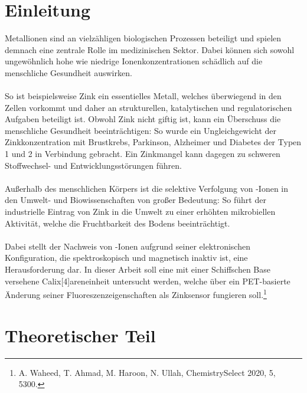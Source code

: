 \documentclass[12pt,a4paper]{report}
\begin{document}
	\chapter{Einleitung}
	\noindent Metallionen sind an vielzähligen biologischen Prozessen beteiligt und spielen demnach eine zentrale Rolle im medizinischen Sektor. Dabei können sich sowohl ungewöhnlich hohe wie niedrige Ionenkonzentrationen schädlich auf die menschliche Gesundheit auswirken.\\
	\ \\
	So ist beispielsweise Zink ein essentielles Metall, welches überwiegend in den Zellen vorkommt und daher an strukturellen, katalytischen und regulatorischen Aufgaben beteiligt ist. Obwohl Zink nicht giftig ist, kann ein Überschuss die menschliche Gesundheit beeinträchtigen: So wurde ein Ungleichgewicht der Zinkkonzentration mit Brustkrebs, Parkinson, Alzheimer und Diabetes der Typen 1 und 2 in Verbindung gebracht. Ein Zinkmangel kann dagegen zu schweren Stoffwechsel- und Entwicklungsstörungen führen.\\
	\ \\
	Außerhalb des menschlichen Körpers ist die selektive Verfolgung von -Ionen in den Umwelt- und Biowissenschaften von großer Bedeutung: So führt der industrielle Eintrag von Zink in die Umwelt zu einer erhöhten mikrobiellen Aktivität, welche die Fruchtbarkeit des Bodens beeinträchtigt. \\
	\ \\
	Dabei stellt der Nachweis von -Ionen aufgrund seiner elektronischen Konfiguration, die spektroskopisch und magnetisch inaktiv ist, eine Herausforderung dar. In dieser Arbeit soll eine mit einer Schiffschen Base versehene Calix[4]areneinheit untersucht werden, welche über ein PET-basierte Änderung seiner Fluoreszenzeigenschaften als Zinksensor fungieren soll.\footnote{A. Waheed, T. Ahmad, M. Haroon, N. Ullah, ChemistrySelect 2020, 5, 5300. }
	\chapter{Theoretischer Teil}
\end{document}
